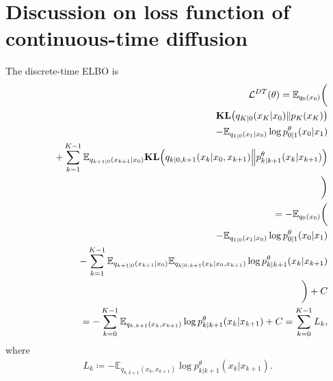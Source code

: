 \documentclass[10pt]{article}
\begin{document}
\section{Discussion on loss function of continuous-time diffusion}
\label{DiscussLoss}

The discrete-time ELBO is
\begin{eqnarray*}
  &&\mathcal{L}^{DT}(\theta)= \mathbb{E}_{q_0(x_0)}\bigg( \\
  &&\qquad \mathbf{KL}\qty(q_{K|0}(x_K|x_0)\| p_K(x_K)) \\
  &&\qquad - \mathbb{E}_{q_{1|0}(x_1|x_0)}\log p^\theta_{0|1}(x_0|x_1) \\
  &&\qquad + \sum_{k=1}^{K - 1} \mathbb{E}_{q_{k+1|0}(x_{k+1}|x_0)}\mathbf{KL}\qty(q_{k|0,k+1}(x_k|x_0,x_{k+1})\middle\|p^\theta_{k|k+1}(x_k|x_{k+1})) \\
  &&\bigg) \\
  && = - \mathbb{E}_{q_0(x_0)}\bigg( \\
  &&\qquad - \mathbb{E}_{q_{1|0}(x_1|x_0)}\log p^\theta_{0|1}(x_0|x_1) \\
  &&\qquad - \sum_{k=1}^{K - 1} \mathbb{E}_{q_{k+1|0}(x_{k+1}|x_0)}\mathbb{E}_{q_{k|0,k+1}(x_k|x_0,x_{k+1})}\log p^\theta_{k|k+1}(x_k|x_{k+1}) \\
  &&\bigg) + C\\
  && = - \sum_{k=0}^{K - 1} \mathbb{E}_{q_{k,k+1}(x_k,x_{k+1})}\log p^\theta_{k|k+1}(x_k|x_{k+1}) + C = \sum_{k=0}^{K - 1} L_k,
\end{eqnarray*}
where
\begin{eqnarray*}
  L_k\coloneqq - \mathbb{E}_{q_{k,k+1}(x_k,x_{k+1})}\log p^\theta_{k|k+1}(x_k|x_{k+1}).
\end{eqnarray*}
\end{document}
